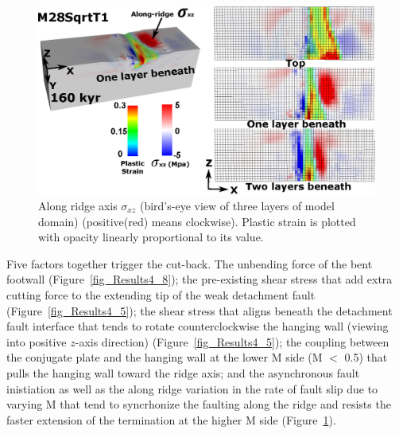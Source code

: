 \begin{figure}[h]
  \centering
    \includegraphics[width=1.0\textwidth]{./Figures/fig_Results_3_2_5_sqrt_cut_back_Sxz_beneath.eps}
  \caption{Along ridge axis $\sigma_{xz}$ (bird's-eye view of three layers of model domain) (positive(red) means clockwise). Plastic strain is plotted with opacity linearly proportional to its value.}
 \label{fig_Results_3_2_5_sqrt_cut_back_Sxz_beneath}
\end{figure}

Five factors together trigger the cut-back. The unbending force of the bent footwall (Figure~\hyperref[fig_Results4_8]{\ref{fig_Results4_8}}); the pre-existing shear stress that add extra cutting force to the extending tip of the weak detachment fault (Figure~\hyperref[fig_Results4_5]{\ref{fig_Results4_5}}); the shear stress that aligns beneath the detachment fault interface that tends to rotate counterclockwise the hanging wall (viewing into positive $z$-axis direction) (Figure~\hyperref[fig_Results4_5]{\ref{fig_Results4_5}}); the coupling between the conjugate plate and the hanging wall at the lower M side (M $<$ 0.5) that pulls the hanging wall toward the ridge axis; and the asynchronous fault inistiation as well as the along ridge variation in the rate of fault slip due to varying M that tend to syncrhonize the faulting along the ridge and resists the faster extension of the termination at the higher M side (Figure~\hyperref[fig_Results_3_2_5_sqrt_cut_back_Sxz_beneath]{\ref{fig_Results_3_2_5_sqrt_cut_back_Sxz_beneath}}).


